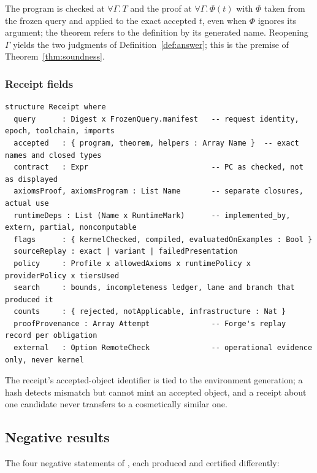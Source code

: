 \begin{invariant}
The program is checked at $\forall \Gamma.\, T$ and the proof at $\forall \Gamma.\, \Phi(t)$ with $\Phi$ taken from the frozen query and applied to the exact accepted $t$, even when $\Phi$ ignores its argument; the theorem refers to the definition by its generated name. Reopening $\Gamma$ yields the two judgments of Definition~\ref{def:answer}; this is the premise of Theorem~\ref{thm:soundness}.
\end{invariant}

\subsubsection{Receipt fields}
\begin{lstlisting}
structure Receipt where
  query      : Digest x FrozenQuery.manifest   -- request identity, epoch, toolchain, imports
  accepted   : { program, theorem, helpers : Array Name }  -- exact names and closed types
  contract   : Expr                            -- PC as checked, not as displayed
  axiomsProof, axiomsProgram : List Name       -- separate closures, actual use
  runtimeDeps : List (Name x RuntimeMark)      -- implemented_by, extern, partial, noncomputable
  flags      : { kernelChecked, compiled, evaluatedOnExamples : Bool }
  sourceReplay : exact | variant | failedPresentation
  policy     : Profile x allowedAxioms x runtimePolicy x providerPolicy x tiersUsed
  search     : bounds, incompleteness ledger, lane and branch that produced it
  counts     : { rejected, notApplicable, infrastructure : Nat }
  proofProvenance : Array Attempt              -- Forge's replay record per obligation
  external   : Option RemoteCheck              -- operational evidence only, never kernel
\end{lstlisting}
The receipt's accepted-object identifier is tied to the environment generation; a hash detects mismatch but cannot mint an accepted object, and a receipt about one candidate never transfers to a cosmetically similar one.

\subsection{Negative results}\label{alg:negatives}

The four negative statements of , each produced and certified differently:

